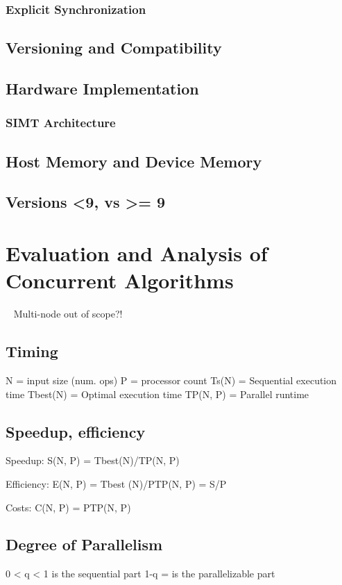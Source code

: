 \subsubsection{Explicit Synchronization}%
\subsection{Versioning and Compatibility}%
\subsection{Hardware Implementation}%
\subsubsection{SIMT Architecture}%
\subsection{Host Memory and Device Memory}
\subsection{Versions <9, vs >= 9}
%
%
%
%
%
\section{Evaluation and Analysis of Concurrent Algorithms}~\cite[p.~330]{Lang17}
Multi-node out of scope?!
%
\subsection{Timing}
	N = input size (num. ops)
	P = processor count
	Ts(N) = Sequential execution time
	Tbest(N) = Optimal execution time
	TP(N, P) = Parallel runtime
%
\subsection{Speedup, efficiency}
	Speedup:
S(N, P) = Tbest(N)/TP(N, P)

	Efficiency:
E(N, P) = Tbest (N)/PTP(N, P) = S/P

	Costs:
C(N, P) = PTP(N, P)
%
\subsection{Degree of Parallelism}
	0 < q < 1 is the sequential part
	1-q = is the parallelizable part
%
